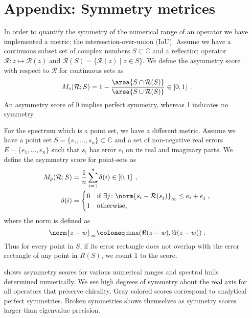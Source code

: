 \chapter{Appendix: Symmetry metrices}
\label{ch:appendix:symmetries}
\label{ch:appendix:D}


In order to quantify the symmetry of the numerical range of an operator we have implemented a metric; the intersection-over-union (IoU).
Assume we have a continuous subset set of complex numbers $S \subseteq \mathbb{C}$ and a reflection operator $\mathcal{R} \colon z \mapsto \mathcal{R}(z)$ and $\mathcal{R}(S) = \{ \mathcal{R}(z) \mid z \in S \} $.
We define the asymmetry score with respect to $\mathcal{R}$ for continuous sets as
\begin{equation} \label{eq:asymmetry:score:cont}
M_c(\mathcal{R}; S)
= 1-
\frac{\area{ S \cap \mathcal{R}(S) }}
     {\area{ S \cup \mathcal{R}(S) }}
\in \left[ 0, 1 \right] \;.
\end{equation}
An asymmetry score of \num{0} implies perfect symmetry, whereas \num{1} indicates no symmetry.

For the spectrum which is a point set, we have a different metric.
Assume we have a point set $S = \{s_1, \ldots, s_n\} \subset \mathbb{C}$ and a set of non-negative real errors $E = \{e_1, \ldots, e_n\}$ such that $s_i$ has error $e_i$ on its real and imaginary parts.
We define the asymmetry score for point-sets as
\begin{align} \label{eq:asymmetry:score:pt}
M_p(\mathcal{R}; S) &= \frac{1}{n} \sum_{i=1}^{n} \delta(i)
\in \left[ 0, 1 \right] \;, \\
\delta(i) &=
\begin{cases}
    0 & \text{if } \exists j \colon \norm{s_i - \mathcal{R}(s_j)}_{\infty} \leq e_i+e_j \;, \\
    1 & \text{otherwise,}
\end{cases}
\end{align}
where the norm is defined as
\begin{equation}
\norm{z - w}_{\infty} \coloneq \max(\Re(z - w), \Im(z - w)) \;.
\end{equation}
Thus for every point in $S$, if its error rectangle does not overlap with the error rectangle of any point in $R(S)$, we count $1$ to the score.

 shows asymmetry scores for various numerical ranges and spectral hulls determined numerically.
We see high degrees of symmetry about the real axis for all operators that preserve chirality.
Gray colored scores correspond to analytical perfect symmetries.
Broken symmetries shows themselves as symmetry scores larger than eigenvalue precision.

